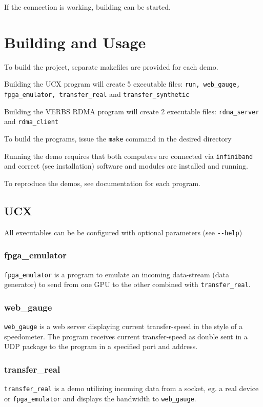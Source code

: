 \documentclass[a4paper,onecolumn]{article}
\begin{document}
If the connection is working, building can be started.








\pagebreak
\section{Building and Usage}
To build the project, separate makefiles are provided for each demo. 

Building the UCX program will create 5 executable files: \verb|run, web_gauge, fpga_emulator, transfer_real| and \verb|transfer_synthetic|

Building the VERBS RDMA program will create 2 executable files: \verb|rdma_server| and \verb|rdma_client|
\vspace{5mm} %

To build the programs, issue the \verb|make| command in the desired directory

Running the demo requires that both computers are connected via \verb|infiniband| and correct (see installation) software and modules are installed and running. 

To reproduce the demos, see documentation for each program.

\subsection{UCX}
All executables can be be configured with optional parameters (see \verb|--help|)


\subsubsection{fpga\_emulator}
\verb|fpga_emulator| is a program to emulate an incoming data-stream (data generator) to send from one GPU to the other combined with \verb|transfer_real|.

\subsubsection{web\_gauge}
\verb|web_gauge| is a web server displaying current transfer-speed in the style of a speedometer. The program receives current transfer-speed as double sent in a UDP package to the program in a specified port and address.

\subsubsection{transfer\_real}
\verb|transfer_real| is a demo utilizing incoming data from a socket, eg. a real device or \verb|fpga_emulator| and displays the bandwidth to \verb|web_gauge|.
\end{document}

